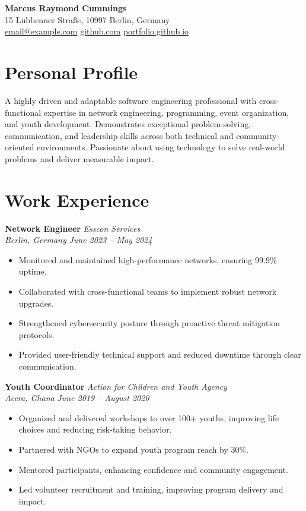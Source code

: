 \documentclass[a4paper,10pt]{article}
\begin{document}
\begin{center}
    \LARGE \textbf{Marcus Raymond Cummings} \\
    \normalsize 15 Lübbenner Straße, 10997 Berlin, Germany \\
    \faEnvelope \hspace{0.5mm} \href{mailto:youremail@example.com}{email@example.com} \quad
    \faGithub \hspace{0.5mm} \href{https://github.com/yourusername}{github.com} \quad
    \faGlobe \hspace{0.5mm} \href{https://yourportfolio.github.io}{portfolio.github.io}
\end{center}

\section*{Personal Profile}
A highly driven and adaptable software engineering professional with cross-functional expertise in network engineering, programming, event organization, and youth development. Demonstrates exceptional problem-solving, communication, and leadership skills across both technical and community-oriented environments. Passionate about using technology to solve real-world problems and deliver measurable impact.

\section*{Work Experience}

\textbf{Network Engineer} \hfill \textit{Esscon Services} \\
\textit{Berlin, Germany} \hfill \textit{June 2023 – May 2024}
\begin{itemize}[leftmargin=*]
    \item Monitored and maintained high-performance networks, ensuring 99.9\% uptime.
    \item Collaborated with cross-functional teams to implement robust network upgrades.
    \item Strengthened cybersecurity posture through proactive threat mitigation protocols.
    \item Provided user-friendly technical support and reduced downtime through clear communication.
\end{itemize}

\textbf{Youth Coordinator} \hfill \textit{Action for Children and Youth Agency} \\
\textit{Accra, Ghana} \hfill \textit{June 2019 – August 2020}
\begin{itemize}[leftmargin=*]
    \item Organized and delivered workshops to over 100+ youths, improving life choices and reducing risk-taking behavior.
    \item Partnered with NGOs to expand youth program reach by 30\%.
    \item Mentored participants, enhancing confidence and community engagement.
    \item Led volunteer recruitment and training, improving program delivery and impact.
\end{itemize}
\end{document}
